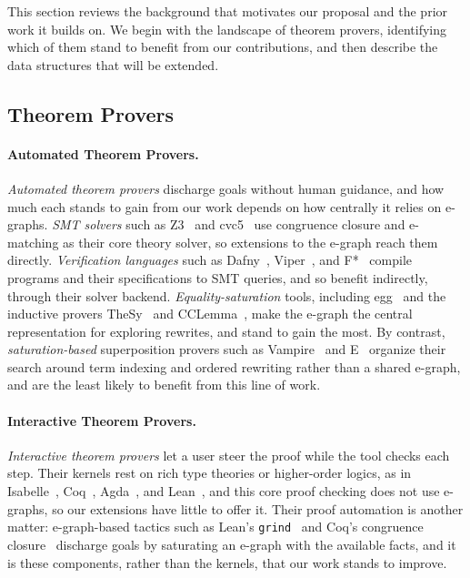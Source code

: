 This section reviews the background that motivates our proposal and the prior
work it builds on. We begin with the landscape of theorem provers, identifying
which of them stand to benefit from our contributions, and then describe the
data structures that will be extended.

\subsection{Theorem Provers}

\paragraph{Automated Theorem Provers.}
\textit{Automated theorem provers} discharge goals without human guidance, and how
much each stands to gain from our work depends on how centrally it relies on
e-graphs. \textit{SMT solvers} such as Z3~\cite{demoura2008z3} and
cvc5~\cite{barbosa2022cvc5} use congruence closure and e-matching as their core
theory solver, so extensions to the e-graph reach them directly.
\textit{Verification languages} such as Dafny~\cite{leino2010dafny},
Viper~\cite{mueller2016viper}, and F*~\cite{swamy2016fstar} compile programs and
their specifications to SMT queries, and so benefit indirectly, through their
solver backend. \textit{Equality-saturation} tools, including
egg~\cite{willsey2021egg} and the inductive provers TheSy~\cite{singher2021thesy}
and CCLemma~\cite{kurashige2024cclemma}, make the e-graph the central
representation for exploring rewrites, and stand to gain the most. By contrast,
\textit{saturation-based} superposition provers such as
Vampire~\cite{kovacs2013vampire} and E~\cite{schulz2013e} organize their search
around term indexing and ordered rewriting rather than a shared e-graph, and are
the least likely to benefit from this line of work.

\paragraph{Interactive Theorem Provers.}
\textit{Interactive theorem provers} let a user steer the proof while the tool
checks each step. Their kernels rest on rich type theories or higher-order
logics, as in Isabelle~\cite{nipkow2002isabelle}, Coq~\cite{bertot2004coq},
Agda~\cite{norell2009agda}, and Lean~\cite{demoura2021lean4}, and this core
proof checking does not use e-graphs, so our extensions have little to offer it.
Their proof automation is another matter: e-graph-based tactics such as Lean's
\texttt{grind}~\cite{leangrind} and Coq's congruence closure~\cite{corbineau2007congruence}
discharge goals by saturating an e-graph with the available facts, and it is
these components, rather than the kernels, that our work stands to improve.

